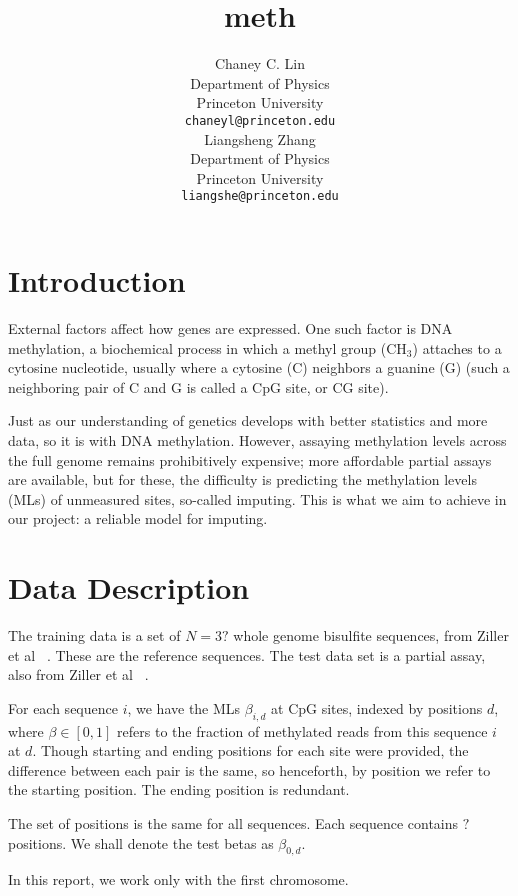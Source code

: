 \documentclass{article} %
\title{meth}
\author{
Chaney C. Lin\\
Department of Physics\\
Princeton University\\
\texttt{chaneyl@princeton.edu} \\
\And
Liangsheng Zhang\\
Department of Physics\\
Princeton University\\
\texttt{liangshe@princeton.edu} \\
}
\begin{document}
\maketitle

\begin{abstract}
\end{abstract}
\section{Introduction}

External factors affect how genes are expressed. One such factor is DNA methylation, a biochemical process in which a methyl group (CH$_3$) attaches to a cytosine nucleotide, usually where a cytosine (C) neighbors a guanine (G) (such a neighboring pair of C and G is called a CpG site, or CG site).

Just as our understanding of genetics develops with better statistics and more data, so it is with DNA methylation. However, assaying methylation levels across the full genome remains prohibitively expensive; more affordable partial assays are available, but for these, the difficulty is predicting the methylation levels (MLs) of unmeasured sites, so-called imputing. This is what we aim to achieve in our project: a reliable model for imputing.

\section{Data Description}

The training data is a set of $N = 3?$ whole genome bisulfite sequences, from Ziller et al ~\cite{ziller2013charting}. These are the reference sequences. The test data set is a partial assay, also from Ziller et al ~\cite{ziller2013charting}.

For each sequence $i$, we have the MLs $\beta_{i,d}$ at CpG sites, indexed by positions $d$, where $\beta \in [0,1]$ refers to the fraction of methylated reads from this sequence $i$ at $d$. Though starting and ending positions for each site were provided, the difference between each pair is the same, so henceforth, by position we refer to the starting position. The ending position is redundant.

The set of positions is the same for all sequences. Each sequence contains $?$ positions. We shall denote the test betas as $\beta_{0,d}$.

In this report, we work only with the first chromosome.
\end{document}
